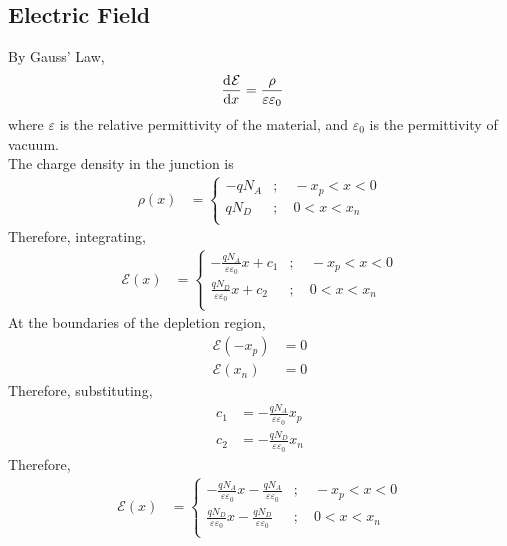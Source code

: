 \documentclass[titlepage, fleqn, a4paper, 12pt, twoside]{article}
\theoremstyle{definition}
\theoremstyle{theorem}
\begin{document}
\subsection{Electric Field}

By Gauss' Law,
\begin{align*}
	\dod{\mathcal{E}}{x} & = \frac{\rho}{\varepsilon \varepsilon_0}
\end{align*}
where $\varepsilon$ is the relative permittivity of the material, and $\varepsilon_0$ is the permittivity of vacuum.\\
The charge density in the junction is
\begin{align*}
	\rho(x)                & =
		\begin{cases}
			-q N_A & ;\quad -x_p < x < 0 \\
			q N_D  & ;\quad 0 < x < x_n  \\
		\end{cases}
\end{align*}
Therefore, integrating,
\begin{align*}
	\mathcal{E}(x) &=
		\begin{cases}
			-\frac{q N_A}{\varepsilon \varepsilon_0} x + c_1 & ;\quad -x_p < x < 0 \\
			\frac{q N_D}{\varepsilon \varepsilon_0} x + c_2  & ;\quad 0 < x < x_n  \\
		\end{cases}
\end{align*}
At the boundaries of the depletion region,
\begin{align*}
	\mathcal{E}(-x_p) & = 0 \\
	\mathcal{E}(x_n)  & = 0
\end{align*}
Therefore, substituting,
\begin{align*}
	c_1 & = -\frac{q N_A}{\varepsilon \varepsilon_0} x_p \\
	c_2 & = -\frac{q N_D}{\varepsilon \varepsilon_0} x_n
\end{align*}
Therefore,
\begin{align*}
	\mathcal{E}(x) &=
		\begin{cases}
			-\frac{q N_A}{\varepsilon \varepsilon_0} x - \frac{q N_A}{\varepsilon \varepsilon_0} & ;\quad -x_p < x < 0 \\
			\frac{q N_D}{\varepsilon \varepsilon_0} x - \frac{q N_D}{\varepsilon \varepsilon_0}  & ;\quad 0 < x < x_n  \\
		\end{cases}
\end{align*}
\end{document}
